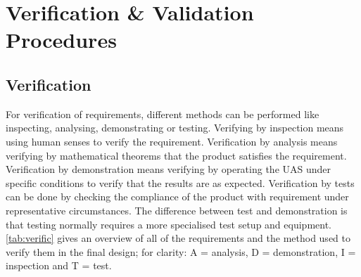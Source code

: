 \chapter{Verification \& Validation Procedures}
\label{ch:v_and_v}


\section{Verification}%

For verification of requirements, different methods can be performed like inspecting, analysing, demonstrating or testing. Verifying by inspection means using human senses to verify the requirement. Verification by analysis means verifying by mathematical theorems that the product satisfies the requirement. Verification by demonstration means verifying by operating the UAS under specific conditions to verify that the results are as expected. Verification by tests can be done by checking the compliance of the product with requirement under representative circumstances. The difference between test and demonstration is that testing normally requires a more specialised test setup and equipment. \autoref{tab:verific} gives an overview of all of the requirements and the method used to verify them in the final design; for clarity: A = analysis, D = demonstration, I = inspection and T = test. 




